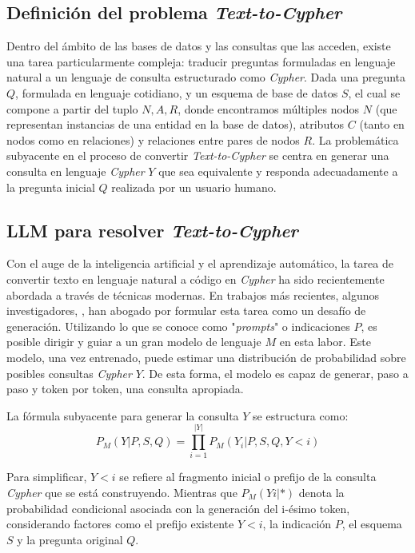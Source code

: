 \subsection{Definición del problema \textit{Text-to-Cypher}} \label{problem_definition}
Dentro del ámbito de las bases de datos y las consultas que las acceden, existe una tarea particularmente compleja: traducir preguntas formuladas en lenguaje natural a un lenguaje de consulta estructurado como \textit{Cypher}. Dada una pregunta $Q$, formulada en lenguaje cotidiano, y un esquema de base de datos $S$, el cual se compone a partir del tuplo ${N, A, R}$, donde encontramos múltiples nodos $N$ (que representan instancias de una entidad en la base de datos), atributos $C$ (tanto en nodos como en relaciones) y relaciones entre pares de nodos $R$. La problemática subyacente en el proceso de convertir \textit{Text-to-Cypher} se centra en generar una consulta en lenguaje \textit{Cypher} $Y$ que sea equivalente y responda adecuadamente a la pregunta inicial $Q$ realizada por un usuario humano.

\subsection{LLM para resolver \textit{Text-to-Cypher}} \label{llmfortext2cypher}

Con el auge de la inteligencia artificial y el aprendizaje automático, la tarea de convertir texto en lenguaje natural a código en \textit{Cypher} ha sido recientemente abordada a través de técnicas modernas. En trabajos más recientes, algunos investigadores, \cite{sunetal2023} \cite{liuetal2023}, han abogado por formular esta tarea como un desafío de generación. Utilizando lo que se conoce como "\textit{prompts}" o indicaciones $P$, es posible dirigir y guiar a un gran modelo de lenguaje $M$ en esta labor. Este modelo, una vez entrenado, puede estimar una distribución de probabilidad sobre posibles consultas \textit{Cypher} $Y$. De esta forma, el modelo es capaz de generar, paso a paso y token por token, una consulta apropiada.

La fórmula subyacente para generar la consulta $Y$ se estructura como:
$$P_M(Y|P, S, Q) = \prod_{i=1}^{|Y|}{P_M(Y_i | P, S, Q, Y < i)}$$ \label{llm_query_generation}

Para simplificar, $Y< i$ se refiere al fragmento inicial o prefijo de la consulta \textit{Cypher} que se está construyendo. Mientras que $P_M(Yi|*)$ denota la probabilidad condicional asociada con la generación del i-ésimo token, considerando factores como el prefijo existente $Y<i$, la indicación $P$, el esquema $S$ y la pregunta original $Q$.

